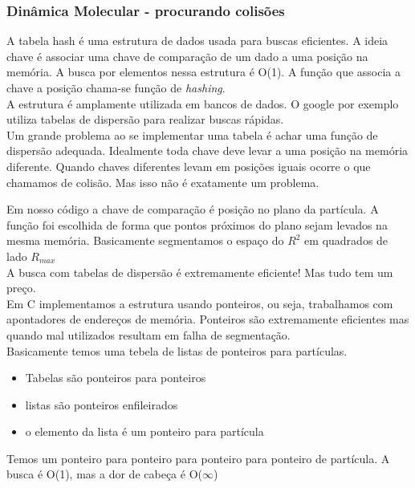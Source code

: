 \documentclass{beamer}
\begin{document}
\begin{frame}
	\frametitle{Dinâmica Molecular - procurando colisões}

	{
	A tabela hash é uma estrutura de dados usada para buscas eficientes. A ideia chave é associar uma chave de comparação de um dado a uma posição na memória. A busca por elementos nessa estrutura é O(1). A função que associa a chave a posição chama-se função de \emph{hashing}.\\
	}		
	\only<3->
	{
	A estrutura é amplamente utilizada em bancos de dados. O google por exemplo utiliza tabelas de dispersão para realizar buscas rápidas.\\
	}
	\only<4->
	{
	Um grande problema ao se implementar uma tabela é achar uma função de dispersão adequada. Idealmente toda chave deve levar a uma posição na memória diferente. Quando chaves diferentes levam em posições iguais ocorre o que chamamos de colisão. Mas isso não é exatamente um problema. \\
	}	
\end{frame}

\begin{frame}
	{
	Em nosso código a chave de comparação é posição no plano da partícula. A função foi escolhida de forma que pontos próximos do plano sejam levados na mesma memória. Basicamente segmentamos o espaço do $R^2$ em quadrados de lado $R_{max}$\\
	}	
	\only<3->
	{
	A busca com tabelas de dispersão é extremamente eficiente! Mas tudo tem um preço.\\
	}	
	\only<3->
	{
	Em C implementamos a estrutura usando ponteiros, ou seja, trabalhamos com apontadores de endereços de memória. Ponteiros são extremamente eficientes mas quando mal utilizados resultam em falha de segmentação. \\
	}	
	\only<4->
	{
	Basicamente temos uma tebela de listas de ponteiros para partículas. \\
	}	
	\only<5->
	{
	\begin{itemize}
		\item Tabelas são ponteiros para ponteiros
		\item listas são ponteiros enfileirados
		\item o elemento da lista é um ponteiro para partícula
	\end{itemize}	 
	}	
	{
	Temos um ponteiro para ponteiro para ponteiro para ponteiro de partícula. A busca é O(1), mas a dor de cabeça é O($\infty$)  
	}	
\end{frame}
\end{document}
